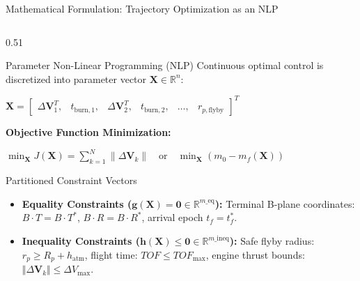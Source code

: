 \documentclass[aspectratio=169, 10pt]{beamer}
\begin{document}
\begin{frame}{Mathematical Formulation: Trajectory Optimization as an NLP}
    \begin{columns}[t]
        \begin{column}{0.51\textwidth}
            \begin{block}{Parameter Non-Linear Programming (NLP)}
                \scriptsize
                Continuous optimal control is discretized into parameter vector $\mathbf{X} \in \mathbb{R}^n$:
                \par\vspace{1pt}
                {\centering $\mathbf{X} = \begin{bmatrix} \Delta \mathbf{V}_1^T, & t_{\text{burn},1}, & \Delta \mathbf{V}_2^T, & t_{\text{burn},2}, & \dots, & r_{p,\text{flyby}} \end{bmatrix}^T$\par}
                \vspace{2pt}
                \textbf{Objective Function Minimization:}
                \par\vspace{1pt}
                {\centering $\displaystyle \min_{\mathbf{X}} J(\mathbf{X}) = \sum_{k=1}^N \|\Delta \mathbf{V}_k\| \quad \text{or} \quad \min_{\mathbf{X}} \left( m_0 - m_f(\mathbf{X}) \right)$\par}
            \end{block}

            \vspace{-0.08cm}

            \begin{block}{Partitioned Constraint Vectors}
                \scriptsize
                \begin{itemize}\setlength{\itemsep}{1.2pt}
                    \item \textbf{Equality Constraints ($\mathbf{g}(\mathbf{X}) = \mathbf{0} \in \mathbb{R}^{m\_{\text{eq}}}$):}
                    Terminal B-plane coordinates: $B\cdot T = B\cdot T^*$, $B\cdot R = B\cdot R^*$, arrival epoch $t_f = t_f^*$.
                    \item \textbf{Inequality Constraints ($\mathbf{h}(\mathbf{X}) \le \mathbf{0} \in \mathbb{R}^{m\_{\text{ineq}}}$):}
                    Safe flyby radius: $r_p \ge R_p + h_{\text{atm}}$, flight time: $TOF \le TOF_{\max}$, engine thrust bounds: $\Vert{}\Delta \mathbf{V}_k\Vert{} \le \Delta V_{\max}$.
                \end{itemize}
            \end{block}
        \end{column}


\end{columns}
\end{frame}
\end{document}
